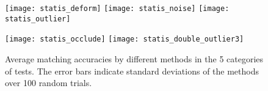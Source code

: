 \documentclass[11pt,bezier,]{article}
\begin{document}
          
    
  
    
    
   
      
    
    
   
  
    
   
        
    
    
    
    
   
    
      
   
    
    
    
   
    
    
    
  
  
    
    
    
\begin{figure}[!ht]


\centering
{\texttt{[image: statis\_deform]}}
{\texttt{[image: statis\_noise]}}
{\texttt{[image: statis\_outlier]}}


{\texttt{[image: statis\_occlude]}}
{\texttt{[image: statis\_double\_outlier3]}}
\caption{
Average matching accuracies  by different methods in the 5 categories of tests.
The error bars indicate standard deviations of the methods over 100 random trials.
\label{3D_test_statis}
}
\end{figure}    
\end{document}
